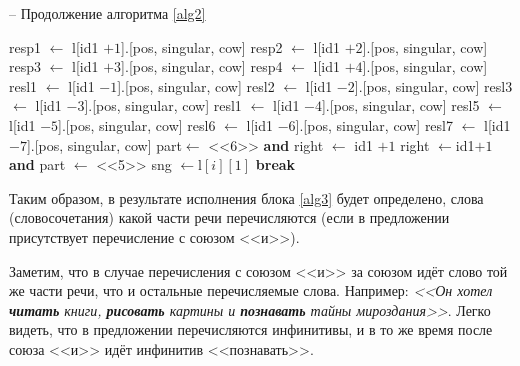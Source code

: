 \documentclass[main]{subfiles}
\begin{document}
\begin{algorithm}
	\caption{-- Продолжение алгоритма \ref{alg2}}\label{alg3}
	\begin{algorithmic}[1]
		\State resp1 $\gets$ l[id1 $+ 1$].[pos, singular, cow] 
			\EndIf
		\State resp2 $\gets$ l[id1 $+ 2$].[pos, singular, cow]
		\EndIf	
		\State resp3 $\gets$ l[id1 $+ 3$].[pos, singular, cow] 
		\EndIf
		\State resp4 $\gets$ l[id1 $+ 4$].[pos, singular, cow]
		\EndIf
		\State resl1 $\gets$ l[id1 $-1$].[pos, singular, cow]
		\EndIf
		\State resl2 $\gets$ l[id1 $-2$].[pos, singular, cow]
		\EndIf
		\State resl3 $\gets$ l[id1 $-3$].[pos, singular, cow]
		\EndIf
		\State resl1 $\gets$ l[id1 $-4$].[pos, singular, cow]
		\EndIf
		\State resl5 $\gets$ l[id1 $-5$].[pos, singular, cow]
		\EndIf
		\State resl6 $\gets$ l[id1 $-6$].[pos, singular, cow]
		\EndIf
		\State resl7 $\gets$ l[id1 $-7$].[pos, singular, cow]
		\EndIf
		 
		\State part$\gets$ <<6>> \textbf{and} right $\gets$ id1 $+1$
				\EndIf
					\EndFor
					\State right $\gets$id1$ + 1$ \textbf{and}  part $\gets$ <<5>>
					\State sng $\gets $l$[i][1]$ 
					\State \textbf{break}
							\EndIf
							\EndFor
									\EndIf
											\EndIf
	\end{algorithmic}
\end{algorithm}

Таким образом, в результате исполнения блока \ref{alg3} будет определено, слова (словосочетания) какой части речи перечисляются (если в предложении присутствует перечисление с союзом <<и>>).

Заметим, что в случае перечисления с союзом <<и>> за союзом идёт слово той же части речи, что и остальные перечисляемые слова. Например: \textit{<<Он хотел \textbf{читать} книги, \textbf{рисовать} картины и \textbf{познавать} тайны мироздания>>}. Легко видеть, что в предложении перечисляются инфинитивы, и в то же время после союза <<и>> идёт инфинитив <<познавать>>.
\end{document}

